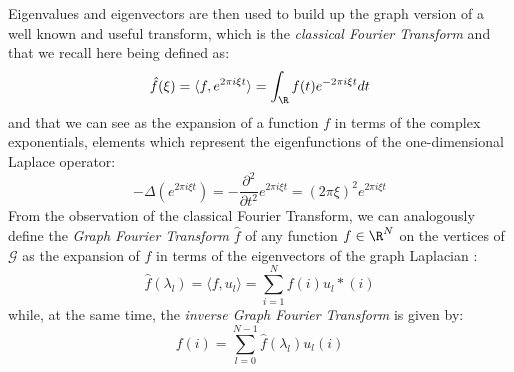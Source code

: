 Eigenvalues and eigenvectors are then used to build up the graph version of a well known and useful transform, which is the \textit{classical Fourier Transform} and that we recall here being defined as:
\begin{equation}
\hat{f}(\xi) = \langle f, e^{2\pi i \xi t}\rangle = \int_{\R} f(t)e^{-2\pi i \xi t} dt
\end{equation}
and that we can see as the expansion of a function $f$ in terms of the complex exponentials, elements which represent the eigenfunctions of the one-dimensional Laplace operator:
\begin{equation}
-\Delta(e^{2\pi i \xi t}) = -\frac{\partial^2}{\partial t^2}e^{2\pi i \xi t} = (2\pi\xi)^2e^{2\pi i \xi t}
\end{equation}
From the observation of the classical Fourier Transform, we can analogously define the \textit{Graph Fourier Transform} $\hat{f}$ of any function $f \in \R^N$ on the vertices of $\mathcal{G}$ as the expansion of $f$ in terms of the eigenvectors of the graph Laplacian \cite{Shuman2013}:
\begin{equation}
\hat{f}(\lambda_l) = \langle f, u_l \rangle = \sum^{N}_{i=1}f(i)u_l*(i)
\end{equation}
while, at the same time, the \textit{inverse Graph Fourier Transform} is given by:
\begin{equation}
f(i) = \sum^{N-1}_{l = 0}\hat{f}(\lambda_l)u_l(i)
\end{equation}
